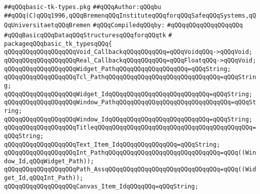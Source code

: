 \label{src/lib/tk/src/basic-tk-types.pkg}
\verb|##qQQqbasic-tk-types.pkg|\newline
\verb|##qQQqAuthor:qQQqbu|\newline
\verb|##qQQq(C)qQQq1996,qQQqBremenqQQqInstituteqQQqforqQQqSafeqQQqSystems,qQQqUniversitaetqQQqBremen|\newline
\newline
\verb|#qQQqCompiledqQQqby:|\newline
\verb|#qQQqqQQqqQQqqQQqqQQq|\newline
\newline
\newline
\verb|#qQQqBasicqQQqDataqQQqStructuresqQQqforqQQqtk|\newline
\verb|#|\newline
\verb|packageqQQqbasic_tk_typesqQQq{|\newline
\newline
\verb|qQQqqQQqqQQqqQQqqQQqVoid_CallbackqQQqqQQqqQQq=qQQqVoidqQQq->qQQqVoid;|\newline
\verb|qQQqqQQqqQQqqQQqqQQqReal_CallbackqQQqqQQqqQQq=qQQqFloatqQQq->qQQqVoid;|\newline
\newline
\verb|qQQqqQQqqQQqqQQqqQQqWidget_PathqQQqqQQqqQQqqQQqqQQq=qQQqString;|\newline
\verb|qQQqqQQqqQQqqQQqqQQqTcl_PathqQQqqQQqqQQqqQQqqQQqqQQqqQQqqQQq=qQQqString;|\newline
\verb|qQQqqQQqqQQqqQQqqQQqWidget_IdqQQqqQQqqQQqqQQqqQQqqQQqqQQq=qQQqString;|\newline
\verb|qQQqqQQqqQQqqQQqqQQqWindow_PathqQQqqQQqqQQqqQQqqQQqqQQqqQQqqQQq=qQQqString;|\newline
\verb|qQQqqQQqqQQqqQQqqQQqWindow_IdqQQqqQQqqQQqqQQqqQQqqQQqqQQq=qQQqString;|\newline
\verb|qQQqqQQqqQQqqQQqqQQqTitleqQQqqQQqqQQqqQQqqQQqqQQqqQQqqQQqqQQqqQQqqQQq=qQQqString;|\newline
\verb|qQQqqQQqqQQqqQQqqQQqText_Item_IdqQQqqQQqqQQqqQQq=qQQqString;|\newline
\verb|qQQqqQQqqQQqqQQqqQQqInt_PathqQQqqQQqqQQqqQQqqQQqqQQqqQQqqQQq=qQQq((Window_Id,qQQqWidget_Path));|\newline
\verb|qQQqqQQqqQQqqQQqqQQqPath_AssqQQqqQQqqQQqqQQqqQQqqQQqqQQqqQQq=qQQq((Widget_Id,qQQqInt_Path));|\newline
\newline
\verb|qQQqqQQqqQQqqQQqqQQqCanvas_Item_IdqQQqqQQq=qQQqString;|\newline
